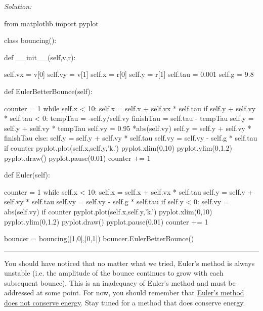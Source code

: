 \begin{enumerate}
\begin{enumerate}
\ifsolutions
\textit{Solution:}\\
\begin{codeexample}
\begin{VerbatimOut}{\listingFile}
from matplotlib import pyplot

class bouncing():

    def __init__(self,v,r):
        
        self.vx = v[0]
        self.vy = v[1]
        self.x = r[0]
        self.y = r[1]
        self.tau = 0.001
        self.g = 9.8



    def EulerBetterBounce(self):

        counter = 1
        while self.x < 10:
            self.x = self.x + self.vx * self.tau
            if self.y + self.vy * self.tau < 0:
                tempTau = -self.y/self.vy
                finishTau = self.tau - tempTau
                self.y = self.y + self.vy * tempTau
                self.vy = 0.95 *abs(self.vy)
                self.y = self.y + self.vy * finishTau
            else:
                self.y = self.y + self.vy * self.tau
                self.vy = self.vy - self.g * self.tau
            if counter %
                pyplot.plot(self.x,self.y,'k.')
                pyplot.xlim(0,10)
                pyplot.ylim(0,1.2)
                pyplot.draw()
                pyplot.pause(0.01)
            counter += 1
            

    def Euler(self):

        counter = 1
        while self.x < 10:
            self.x = self.x + self.vx * self.tau
            self.y = self.y + self.vy * self.tau
            self.vy = self.vy - self.g * self.tau
            if self.y < 0:
                self.vy = abs(self.vy)
            if counter %
                pyplot.plot(self.x,self.y,'k.')
                pyplot.xlim(0,10)
                pyplot.ylim(0,1.2)
                pyplot.draw()
                pyplot.pause(0.01)
            counter += 1

bouncer = bouncing([1,0],[0,1])
bouncer.EulerBetterBounce()
\end{VerbatimOut}
\end{codeexample}
\else
\noindent\rule{4 in}{0.01 in}
\fi

\end{enumerate}
\end{enumerate}


You should have noticed that no matter what we tried, Euler's method is
always unstable (i.e.  the amplitude of the bounce continues to grow
with each subsequent bounce).  This is an inadequacy of Euler's method
and must be addressed at some point. For now, you should remember that
\ul{Euler's method does not conserve energy}.  Stay tuned for a method
that does conserve energy.


